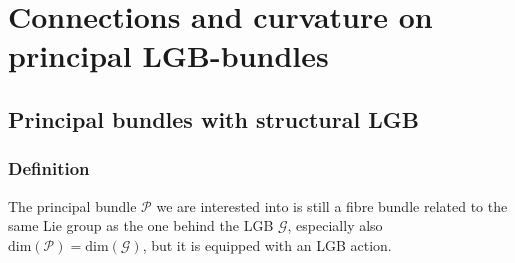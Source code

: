 \documentclass[a4paper,oneside,11pt,bibliography=totoc]{scrartcl}
\theoremstyle{plain}
\theoremstyle{remark}
\theoremstyle{definition}
\begin{document}
\section{Connections and curvature on principal LGB-bundles}\label{ConnCurvOnPrincLGBBundle}

\subsection{Principal bundles with structural LGB}\label{PrincBundlLGBBased}

\subsubsection{Definition}

The principal bundle $\mathcal{P}$ we are interested into is still a fibre bundle related to the same Lie group as the one behind the LGB $\mathcal{G}$, especially also $\mathrm{dim}(\mathcal{P}) = \mathrm{dim}(\mathcal{G})$, but it is equipped with an LGB action.
\end{document}

